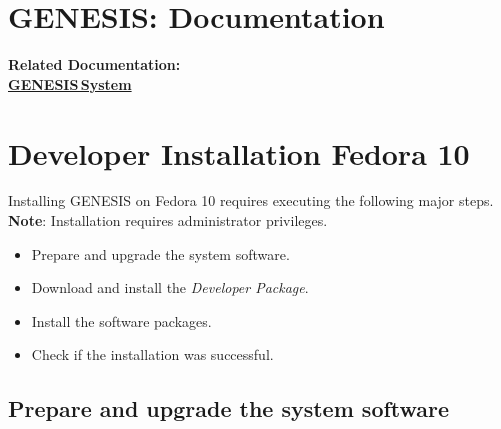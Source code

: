 \documentclass[12pt]{article}
\begin{document}
\section*{GENESIS: Documentation}

{\bf Related Documentation:} \\
\href{../genesis-system/genesis-system.tex}{\bf GENESIS\,System}

\section*{Developer Installation Fedora 10}

Installing GENESIS on Fedora 10 requires executing the following major steps. {\bf Note}: Installation requires administrator privileges.
\begin{itemize}
   \item[] Prepare and upgrade the system software.
   \item[] Download and install the {\it Developer Package}.
   \item[] Install the software packages.
   \item[] Check if the installation was successful. 
\end{itemize}

\subsection*{Prepare and upgrade the system software}
\end{document}
